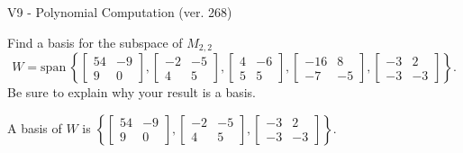 \begin{exercise}
  \begin{exerciseTitle}V9 - Polynomial Computation (ver. 268)\end{exerciseTitle}
  \begin{exerciseStatement}
    Find a basis for the subspace of \(M_{2,2}\) 
\[W=\mathrm{span}\ \left\{\left[\begin{array}{cc}
54 & -9 \\
9 & 0
\end{array}\right] , \left[\begin{array}{cc}
-2 & -5 \\
4 & 5
\end{array}\right] , \left[\begin{array}{cc}
4 & -6 \\
5 & 5
\end{array}\right] , \left[\begin{array}{cc}
-16 & 8 \\
-7 & -5
\end{array}\right] , \left[\begin{array}{cc}
-3 & 2 \\
-3 & -3
\end{array}\right]\right\}.\]
 Be sure to explain why your result is a basis.


  \end{exerciseStatement}
  \begin{exerciseAnswer}
   A basis of \(W\) is  \(\left\{\left[\begin{array}{cc}
54 & -9 \\
9 & 0
\end{array}\right] , \left[\begin{array}{cc}
-2 & -5 \\
4 & 5
\end{array}\right] , \left[\begin{array}{cc}
-3 & 2 \\
-3 & -3
\end{array}\right]\right\}\).
  


  \end{exerciseAnswer}
\end{exercise}